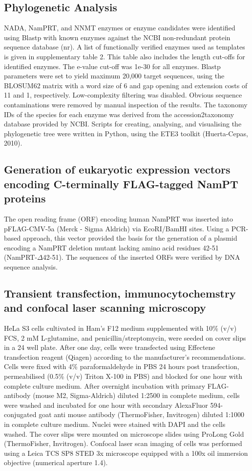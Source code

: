 \subsection{Phylogenetic Analysis}

NADA, NamPRT, and NNMT enzymes or enzyme candidates were identified using Blastp with known enzymes against the NCBI non-redundant protein sequence database (nr). A list of functionally verified enzymes used as templates is given in supplementary table 2. This table also includes the length cut-offs for identified enzymes. The e-value cut-off was 1e-30 for all enzymes. Blastp parameters were set to yield maximum 20,000 target sequences, using the BLOSUM62 matrix with a word size of 6 and gap opening and extension costs of 11 and 1, respectively. Low-complexity filtering was disabled. Obvious sequence contaminations were removed by manual inspection of the results. The taxonomy IDs of the species for each enzyme was derived from the accession2taxonomy database provided by NCBI. Scripts for creating, analysing, and visualising the phylogenetic tree were written in Python, using the ETE3 toolkit (Huerta-Cepas, 2010).


\subsection{Generation of eukaryotic expression vectors encoding C-terminally FLAG-tagged NamPT proteins}

The open reading frame (ORF) encoding human NamPRT was inserted into pFLAG-CMV-5a (Merck - Sigma Aldrich) via EcoRI/BamHI sites. Using a PCR-based approach, this vector provided the basis for the generation of a plasmid encoding a NamPRT deletion mutant lacking amino acid residues 42-51 (NamPRT-$\Delta$42-51). The sequences of the inserted ORFs were verified by DNA sequence analysis.


\subsection{Transient transfection, immunocytochemstry and confocal laser scanning microscopy}

HeLa S3 cells cultivated in Ham’s F12 medium supplemented with 10\% (v/v) FCS, 2 mM L-glutamine, and penicillin/streptomycin, were seeded on cover slips in a 24 well plate. After one day, cells were transfected using Effectene transfection reagent (Qiagen) according to the manufacturer’s recommendations. Cells were fixed with 4\% paraformaldehyde in PBS 24 hours post transfection, permeabilised (0.5\% (v/v) Triton X-100 in PBS) and blocked for one hour with complete culture medium. After overnight incubation with primary FLAG-antibody (mouse M2, Sigma-Aldrich) diluted 1:2500 in complete medium, cells were washed and incubated for one hour with secondary AlexaFluor 594-conjugated goat anti mouse antibody (ThermoFisher, Invitrogen) diluted 1:1000 in complete culture medium. Nuclei were stained with DAPI and the cells washed. The cover slips were mounted on microscope slides using ProLong Gold (ThermoFisher, Invitrogen). Confocal laser scan imaging of cells was performed using a Leica TCS SP8 STED 3x microscope equipped with a 100x oil immersion objective (numerical aperture 1.4).